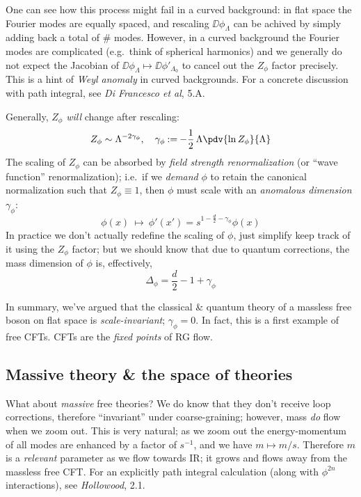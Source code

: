 \documentclass[a4paper
	,10pt
]{article}
\begin{document}
	One can see how this process might fail in a curved background: in flat space the Fourier modes are equally spaced, and rescaling $\DD\phi_{\Lambda}$ can be achived by simply adding back a total of $\#$ modes. However, in a curved background the Fourier modes are complicated (e.g.\ think of spherical harmonics) and we generally do not expect the Jacobian of $\DD\phi_{\Lambda} \mapsto \DD\phi'_{\Lambda_0}$ to cancel out the $Z_\phi$ factor precisely. This is a hint of \textit{Weyl anomaly} in curved backgrounds. For a concrete discussion with path integral, see \textit{Di Francesco et al}, 5.A. 
\pagebreak[4]
	
	Generally, $Z_\phi$ \textit{will} change after rescaling:
	\begin{equation}
		Z_\phi \sim \Lambda^{-2\gamma_\phi},
	\quad
		\gamma_\phi
		\mathbin{:=}
		-\frac{1}{2}\,\Lambda \pdv{\ln Z_\phi}{\Lambda}
	\end{equation}
	The scaling of $Z_\phi$ can be absorbed by \textit{field strength renormalization} (or ``wave function'' renormalization); i.e.\ if we \textit{demand} $\phi$ to retain the canonical normalization such that $Z_\phi \equiv 1$, then $\phi$ must scale with an \textit{anomalous dimension} $\gamma_\phi$:
	\begin{equation}
		\phi(x) 
		\ \longmapsto\ %
		\phi'(x') = s^{1 - \frac{d}{2} - \gamma_\phi} \phi(x)
	\end{equation}
	In practice we don't actually redefine the scaling of $\phi$, just simplify keep track of it using the $Z_\phi$ factor; but we should know that due to quantum corrections, the mass dimension of $\phi$ is, effectively,
	\begin{equation}
		\Delta_\phi
		= \frac{d}{2} - 1 + \gamma_\phi
	\end{equation}
	
	In summary, we've argued that the classical \& quantum theory of a massless free boson on flat space is \textit{scale-invariant}; $\gamma_\phi = 0$. In fact, this is a first example of free CFTs. 
	CFTs are the \textit{fixed points} of RG flow.
\subsection{Massive theory \& the space of theories}
	What about \textit{massive} free theories? We do know that they don't receive loop corrections, therefore ``invariant'' under coarse-graining; however, mass \textit{do} flow when we zoom out. This is very natural; as we zoom out the energy-momentum of all modes are enhanced by a factor of $s^{-1}$, and we have $m\mapsto m/s$. Therefore $m$ is a \textit{relevant} parameter as we flow towards IR; it grows and flows away from the massless free CFT. For an explicitly path integral calculation (along with $\phi^{2n}$ interactions), see \textit{Hollowood}, 2.1. 
	
\end{document}
